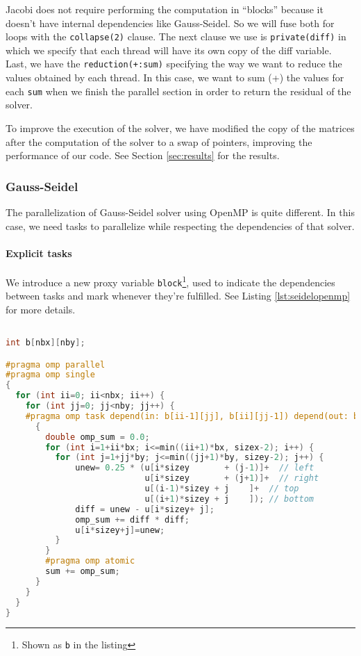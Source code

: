 \documentclass[a4paper, 10pt]{article}
\begin{document}
Jacobi does not require performing the computation in ``blocks'' because it doesn't have internal dependencies like Gauss-Seidel. 
So we will fuse both for loops with the \texttt{collapse(2)} clause. The next clause we use is \texttt{private(diff)} in which we specify 
that each thread will have its own copy of the diff variable. Last, we have the \texttt{reduction(+:sum)} specifying 
the way we want to reduce the values obtained by each thread. In this case, we want to sum (+) the values for each \texttt{sum} when we 
finish the parallel section in order to return the residual of the solver.

To improve the execution of the solver, we have modified the copy of the matrices after the computation of the solver to a swap of pointers, improving the performance of our code. See Section \ref{sec:results} for the results.

\clearpage

\subsubsection{Gauss-Seidel}

The parallelization of Gauss-Seidel solver using OpenMP is quite different. In this case, we need tasks to parallelize while 
respecting the dependencies of that solver. 

\paragraph{Explicit tasks\\}


We introduce a new proxy variable \texttt{block}\footnote{Shown as \texttt{b} in the listing}, used to indicate the dependencies between tasks and mark whenever they're fulfilled. See Listing \ref{lst:seidelopenmp} for more details.

\begin{lstlisting}[language=c, caption={OpenMP pragma for Gauss-Seidel parallelization}, label={lst:seidelopenmp}]

int b[nbx][nby];

#pragma omp parallel
#pragma omp single
{
  for (int ii=0; ii<nbx; ii++) {
    for (int jj=0; jj<nby; jj++) {
    #pragma omp task depend(in: b[ii-1][jj], b[ii][jj-1]) depend(out: b[ii][jj]) private(diff, unew) 
      {
        double omp_sum = 0.0;
        for (int i=1+ii*bx; i<=min((ii+1)*bx, sizex-2); i++) {
          for (int j=1+jj*by; j<=min((jj+1)*by, sizey-2); j++) {
              unew= 0.25 * (u[i*sizey	    + (j-1)]+  // left
                            u[i*sizey	    + (j+1)]+  // right
                            u[(i-1)*sizey + j    ]+  // top
                            u[(i+1)*sizey + j    ]); // bottom
              diff = unew - u[i*sizey+ j];
              omp_sum += diff * diff; 
              u[i*sizey+j]=unew;
          } 
        }
        #pragma omp atomic
        sum += omp_sum;
      }
    }
  }
}
\end{lstlisting}
\end{document}
